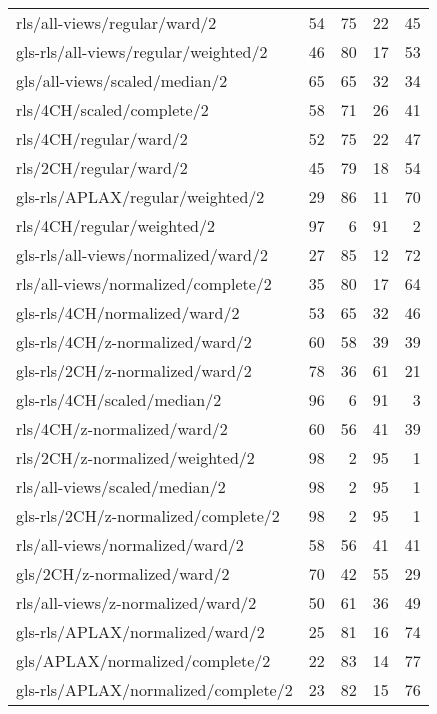 \begin{longtable}{lrrrr}
    rls/all-views/regular/ward/2              & 54 & 75 & 22 & 45 \\
    gls-rls/all-views/regular/weighted/2      & 46 & 80 & 17 & 53 \\
    gls/all-views/scaled/median/2             & 65 & 65 & 32 & 34 \\
    rls/4CH/scaled/complete/2                 & 58 & 71 & 26 & 41 \\
    rls/4CH/regular/ward/2                    & 52 & 75 & 22 & 47 \\
    rls/2CH/regular/ward/2                    & 45 & 79 & 18 & 54 \\
    gls-rls/APLAX/regular/weighted/2          & 29 & 86 & 11 & 70 \\
    rls/4CH/regular/weighted/2                & 97 &  6 & 91 &  2 \\
    gls-rls/all-views/normalized/ward/2       & 27 & 85 & 12 & 72 \\
    rls/all-views/normalized/complete/2       & 35 & 80 & 17 & 64 \\
    gls-rls/4CH/normalized/ward/2             & 53 & 65 & 32 & 46 \\
    gls-rls/4CH/z-normalized/ward/2           & 60 & 58 & 39 & 39 \\
    gls-rls/2CH/z-normalized/ward/2           & 78 & 36 & 61 & 21 \\
    gls-rls/4CH/scaled/median/2               & 96 &  6 & 91 &  3 \\
    rls/4CH/z-normalized/ward/2               & 60 & 56 & 41 & 39 \\
    rls/2CH/z-normalized/weighted/2           & 98 &  2 & 95 &  1 \\
    rls/all-views/scaled/median/2             & 98 &  2 & 95 &  1 \\
    gls-rls/2CH/z-normalized/complete/2       & 98 &  2 & 95 &  1 \\
    rls/all-views/normalized/ward/2           & 58 & 56 & 41 & 41 \\
    gls/2CH/z-normalized/ward/2               & 70 & 42 & 55 & 29 \\
    rls/all-views/z-normalized/ward/2         & 50 & 61 & 36 & 49 \\
    gls-rls/APLAX/normalized/ward/2           & 25 & 81 & 16 & 74 \\
    gls/APLAX/normalized/complete/2           & 22 & 83 & 14 & 77 \\
    gls-rls/APLAX/normalized/complete/2       & 23 & 82 & 15 & 76 \\

\end{longtable}
